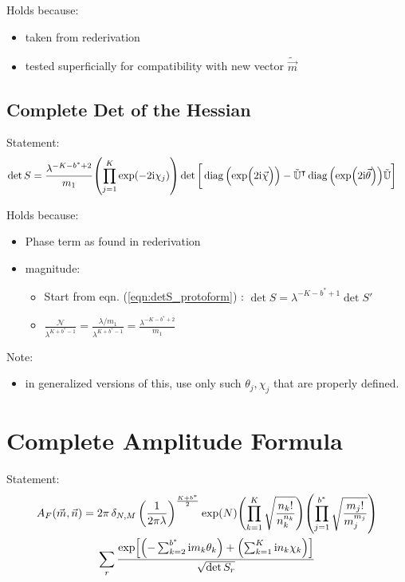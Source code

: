 \documentclass[
	english,
	a4paper,
	fontsize=10pt,
	parskip=half,
	titlepage=true,
	DIV=12,
	final
]{scrreprt}
\newcommand*{\transp}{\ensuremath{^\intercal}}
\newcommand*{\iunit}{\ensuremath{\mathrm{i}}}
\DeclareMathOperator{\diag}{diag}
\begin{document}
Holds because:
\begin{itemize}
\item taken from rederivation
\item tested superficially for compatibility with new vector $\tilde{\vec{m}}$
\end{itemize}

\subsection{Complete Det of the Hessian}
Statement:
\begin{align}
	\det S
&=
	\frac{ \lambda^{-K - b^* + 2} }{ m_1 }
	\qty( \prod_{j=1}^{K} \exp(-2\iunit \chi_j) )
	\det\qty[\bigg.
		\diag\qty(\exp(\Big.2\iunit\vec{\chi}))
		-
		\tilde{\mathbb{U}}\transp
		\diag\qty(\exp(2\iunit\vec{\theta}))
		\tilde{\mathbb{U}}
	]
\label{eqn:detComplete}
\end{align}

Holds because:
\begin{itemize}
\item Phase term as found in rederivation
\item magnitude:
	\begin{itemize}
	\item Start from eqn. (\ref{eqn:detS_protoform}) : $\det S = \lambda^{-K - b^* + 1} \det S'$
	\item $
	\frac
		{\mathcal{N}}
		{\lambda^{K + b^* - 1}}
=
	\frac
		{\lambda / m_1}
		{\lambda^{K + b^* - 1}}
=
	\frac{\lambda^{- K - b^* + 2}}{m_1}
$	
	\end{itemize}
\end{itemize}

Note:
\begin{itemize}
\item in generalized versions of this, use only such $\theta_j, \chi_j$ that are properly defined.
\end{itemize}

\section{Complete Amplitude Formula}
Statement:
\begin{multline}
	A_F(\vec{m}, \vec{n})
=
	2\pi \, \delta_{N,M} \, \qty(
		\frac{1}{2\pi\lambda}
	)^{\frac{K + b^*}{2}}
	\exp(N)
	\qty( \prod_{k=1}^{K}
		\sqrt{\frac
			{ n_k! }
			{ n_k^{n_k} }
	})
	\qty( \prod_{j=1}^{b^*}
		\sqrt{\frac
			{ m_j! }
			{ m_j^{m_j} }
	})
\\
	\sum_r
		\frac
		{\exp[
			\qty(- \sum_{k=2}^{b^*} \iunit m_k \theta_k) + 
			\qty(  \sum_{k=1}^{K}   \iunit n_k \chi  _k)
		]}
		{\sqrt{\det S_r}}
\end{multline}
\end{document}
